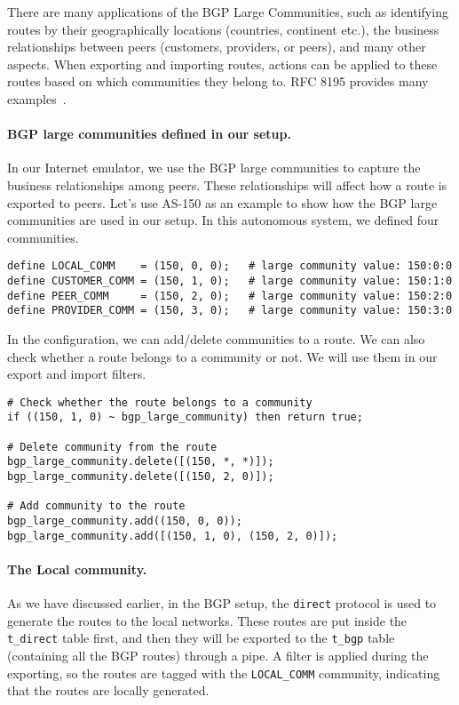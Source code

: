 There are many applications of the BGP Large Communities, such as 
identifying routes by their geographically locations (countries, 
continent etc.), the business relationships between peers (customers,
providers, or peers), and many other aspects. When exporting and importing 
routes, actions can be applied to these routes based on which
communities they belong to. RFC 8195 provides many 
examples~\cite{ref8195}.

\paragraph{BGP large communities defined in our setup.}
In our Internet emulator, we use the BGP large communities to 
capture the business relationships among peers. These relationships
will affect how a route is exported to peers. 
Let's use AS-150 as an example to show how the BGP large communities are used
in our setup. In this autonomous system, we defined four communities. 

\begin{lstlisting}
define LOCAL_COMM    = (150, 0, 0);   # large community value: 150:0:0
define CUSTOMER_COMM = (150, 1, 0);   # large community value: 150:1:0
define PEER_COMM     = (150, 2, 0);   # large community value: 150:2:0
define PROVIDER_COMM = (150, 3, 0);   # large community value: 150:3:0
\end{lstlisting}


In the configuration, we can add/delete communities to a route. We can
also check whether a route belongs to a community or not.
We will use them in our export and import filters. 

\begin{lstlisting}
# Check whether the route belongs to a community
if ((150, 1, 0) ~ bgp_large_community) then return true;

# Delete community from the route
bgp_large_community.delete([(150, *, *)]);
bgp_large_community.delete([(150, 2, 0)]);

# Add community to the route
bgp_large_community.add((150, 0, 0));
bgp_large_community.add([(150, 1, 0), (150, 2, 0)]);
\end{lstlisting}
 


\paragraph{The Local community.}
As we have discussed earlier, in the BGP setup, 
the \texttt{direct} protocol is used to generate the routes
to the local networks. These routes are put inside
the \texttt{t\_direct} table first, and then they
will be exported to the \texttt{t\_bgp} table (containing
all the BGP routes) through a pipe. 
A filter is applied during the exporting, so the 
routes are tagged with the \texttt{LOCAL\_COMM}
community, indicating that the routes are locally 
generated. 

